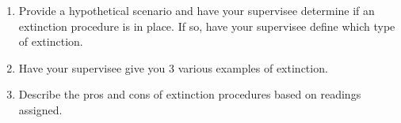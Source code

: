 \begin{enumerate}
\item Provide a hypothetical scenario and have your supervisee determine if an extinction procedure is in place. If so, have your supervisee define which type of extinction.
\item Have your supervisee give you 3 various examples of extinction. 
\item Describe the pros and cons of extinction procedures based on readings assigned.
%
\end{enumerate}
%

